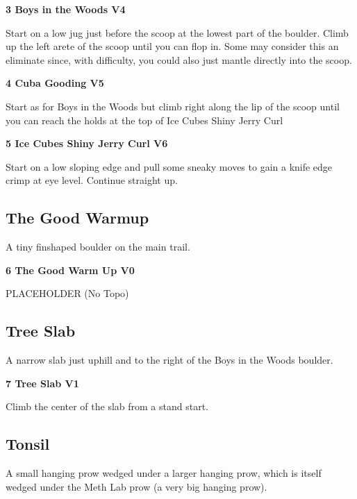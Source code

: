 \begin{multicols*}{2}

					\label{rt:Boys in the Woods} \colorbox{RoyalBlue!20}{\textbf{3 Boys in the Woods V4 \ding{72}   }}
					\begin{adjustwidth}{1cm}{}
					Start on a low jug just before the scoop at the lowest part of the boulder. Climb up the left arete of the scoop until you can flop in. Some may consider this an eliminate since, with difficulty, you could also just mantle directly into the scoop.
					\end{adjustwidth}
					\label{rt:Cuba Gooding} \colorbox{RoyalBlue!20}{\textbf{4 Cuba Gooding V5  }}
					\begin{adjustwidth}{1cm}{}
					Start as for Boys in the Woods but climb right along the lip of the scoop until you can reach the holds at the top of Ice Cubes Shiny Jerry Curl
					\end{adjustwidth}
					\label{rt:Ice Cubes Shiny Jerry Curl} \colorbox{RoyalBlue!20}{\textbf{5 Ice Cubes Shiny Jerry Curl V6  }}
					\begin{adjustwidth}{1cm}{}
					Start on a low sloping edge and pull some sneaky moves to gain a knife edge crimp at eye level. Continue straight up.
					\end{adjustwidth}
			\subsection*{The Good Warmup}\label{bf:The Good Warmup}
			A tiny finshaped boulder on the main trail.
			
					\label{rt:The Good Warm Up} \colorbox{green!20}{\textbf{6 The Good Warm Up V0  }}
					\begin{adjustwidth}{1cm}{}
					PLACEHOLDER
						\newline (No Topo) 
					\end{adjustwidth}
			\subsection*{Tree Slab}\label{bf:Tree Slab}
			A narrow slab just uphill and to the right of the Boys in the Woods boulder.
			
					\label{rt:Tree Slab} \colorbox{green!20}{\textbf{7 Tree Slab V1    }}
					\begin{adjustwidth}{1cm}{}
					Climb the center of the slab from a stand start.
					\end{adjustwidth}
			\subsection*{Tonsil}\label{bf:Tonsil}
			A small hanging prow wedged under a larger hanging prow, which is itself wedged under the Meth Lab prow (a very big hanging prow).
			

\end{multicols*}
